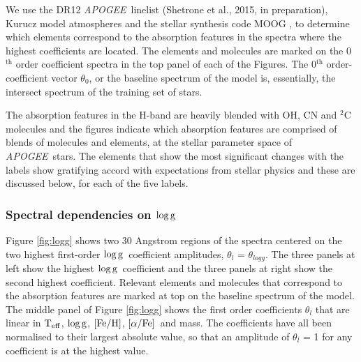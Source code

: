 \documentclass[12pt, preprint]{aastex}
\newcommand{\project}[1]{\textsl{#1}}
\newcommand{\apogee}{\project{APOGEE}}
\newcommand{\teff}{\mbox{$\rm T_{eff}$}}
\newcommand{\feh}{\mbox{$\rm [Fe/H]$}}
\newcommand{\alphafe}{\mbox{$\rm [\alpha/Fe]$}}
\newcommand{\logg}{\mbox{$\rm \log g$}}
\begin{document}
We use the DR12 \apogee\ linelist (Shetrone et al., 2015, in preparation), Kurucz model atmospheres \citep{castelli2004} and the stellar synthesis code MOOG \citep{sneden1979}, to determine which elements correspond to the absorption features in the spectra where the highest coefficients are located. The elements and molecules are marked on the 0$^{\mbox{th}}$ order coefficient spectra in the top panel of each of the Figures. The 0$^{\mbox{th}}$ order-coefficient vector $\theta_0$, or the baseline spectrum of the model is, essentially, the intersect spectrum of the training set of stars. 

The absorption features in the H-band are heavily blended with OH, CN and $^2$C molecules and the figures indicate which absorption features are comprised of blends of molecules and elements, at the stellar parameter space of \apogee\ stars. The elements that show the most significant changes with the labels show gratifying accord with expectations from stellar physics and these are discussed below, for each of the five labels. 

\subsubsection{Spectral dependencies on \logg} 

Figure \ref{fig:logg} shows two 30 Angstrom regions of the spectra centered on the two highest first-order \logg\ coefficient amplitudes, $\theta_l$ = $\theta_{logg}$. The three panels at left show the highest \logg\ coefficient and the three panels at right show the second highest coefficient. Relevant elements and molecules that correspond to the absorption features are marked at top on the baseline spectrum of the model.  The middle panel of Figure \ref{fig:logg} shows the first order coefficients $\theta_l$ that are linear in \teff, \logg, \feh, \alphafe\ and mass. The coefficients have all been normalised to their largest absolute value, so that an amplitude of $\theta_l$ = 1 for any coefficient is at the highest value.  
\end{document}
